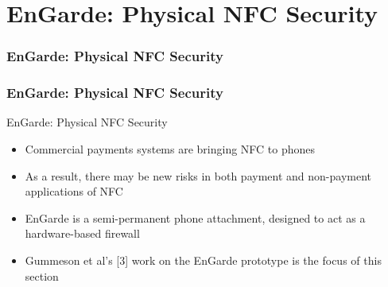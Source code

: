 \documentclass[unknownkeysallowed]{beamer}
\begin{document}
\section{EnGarde: Physical NFC Security}
\begin{frame}
\frametitle{EnGarde: Physical NFC Security}
\begin{center}\begin{minipage}{.9\textwidth}
\tableofcontents[currentsubsection, hideothersubsections, sectionstyle=show/shaded]
\end{minipage}\end{center}
\end{frame}
%

\begin{frame}
\frametitle{EnGarde: Physical NFC Security}
  \begin{center}
  \begin{minipage}{.9\textwidth}
  \begin{block}{EnGarde: Physical NFC Security}
    \begin{itemize}
      \item{Commercial payments systems are bringing NFC to phones}
      \pause
      \vspace{1mm}
      \item{As a result, there may be new risks in both payment and non-payment applications of NFC}
      \pause
      \vspace{1mm}
      \item{EnGarde is a semi-permanent phone attachment, designed to act as a hardware-based firewall}
      \pause
      \vspace{1mm}
      \item{Gummeson et al's [3] work on the EnGarde prototype is the focus of this section}
    \end{itemize}
  \end{block}
  \end{minipage}
  \end{center}
\end{frame}
\end{document}

